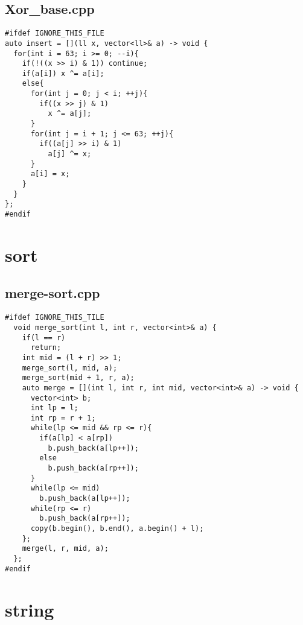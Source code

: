 \documentclass[UTF8, a4paper, titlepage, twoside]{ctexart}
\begin{document}
\subsection{Xor_base.cpp}
\begin{verbatim}
#ifdef IGNORE_THIS_FILE
auto insert = [](ll x, vector<ll>& a) -> void {
  for(int i = 63; i >= 0; --i){
    if(!((x >> i) & 1)) continue;
    if(a[i]) x ^= a[i];
    else{
      for(int j = 0; j < i; ++j){
        if((x >> j) & 1) 
          x ^= a[j];
      }
      for(int j = i + 1; j <= 63; ++j){
        if((a[j] >> i) & 1) 
          a[j] ^= x;
      }
      a[i] = x;
    }
  }
};
#endif
\end{verbatim}

\clearpage
\section{sort}
\subsection{merge-sort.cpp}
\begin{verbatim}
#ifdef IGNORE_THIS_TILE
  void merge_sort(int l, int r, vector<int>& a) {
    if(l == r)
      return;
    int mid = (l + r) >> 1;
    merge_sort(l, mid, a);
    merge_sort(mid + 1, r, a);
    auto merge = [](int l, int r, int mid, vector<int>& a) -> void {
      vector<int> b;
      int lp = l;
      int rp = r + 1;
      while(lp <= mid && rp <= r){
        if(a[lp] < a[rp])
          b.push_back(a[lp++]);
        else  
          b.push_back(a[rp++]);
      }
      while(lp <= mid)
        b.push_back(a[lp++]);
      while(rp <= r)
        b.push_back(a[rp++]);
      copy(b.begin(), b.end(), a.begin() + l);
    };
    merge(l, r, mid, a);
  };
#endif
\end{verbatim}

\clearpage
\section{string}
\end{document}
